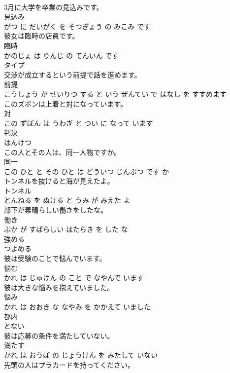 \documentclass[8pt]{extreport}
\begin{document}
\begin{CJK}{UTF8}{min}
\\	3月に大学を卒業の見込みです。	
\\	見込み 
\\	がつ に だいがく を そつぎょう の みこみ です			
\\	彼女は臨時の店員です。	
\\	臨時 
\\	かのじょ は りんじ の てんいん です			
\\	タイプ	
\\	交渉が成立するという前提で話を進めます。	
\\	前提 
\\	こうしょう が せいりつ する と いう ぜんてい で はなし を すすめます			
\\	このズボンは上着と対になっています。	
\\	対 
\\	この ずぼん は うわぎ と つい に なって います			
\\	判決	
\\	はんけつ		
\\	この人とその人は、同一人物ですか。	
\\	同一 
\\	この ひと と その ひと は どういつ じんぶつ です か			
\\	トンネルを抜けると海が見えたよ。	
\\	トンネル 
\\	とんねる を ぬける と うみ が みえた よ			
\\	部下が素晴らしい働きをしたな。	
\\	働き 
\\	ぶか が すばらしい はたらき を した な			
\\	強める	
\\	つよめる		
\\	彼は受験のことで悩んでいます。	
\\	悩む 
\\	かれ は じゅけん の こと で なやんで います			
\\	彼は大きな悩みを抱えていました。	
\\	悩み 
\\	かれ は おおき な なやみ を かかえて いました			
\\	都内	
\\	とない		
\\	彼は応募の条件を満たしていない。	
\\	満たす 
\\	かれ は おうぼ の じょうけん を みたして いない			
\\	先頭の人はプラカードを持ってください。	

\end{CJK}
\end{document}
